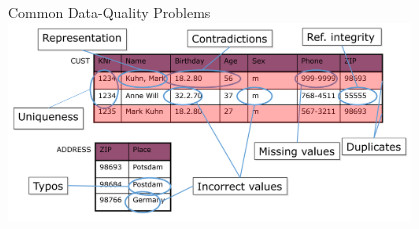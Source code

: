 \documentclass[aspectratio=169]{../latex_main/tntbeamer}  %
\begin{document}
\begin{frame}[c]{Common Data-Quality Problems}
    \centering
    \includegraphics[width=0.8\textwidth]{bild13_dataquality_problems.png}

\end{frame}
\end{document}

